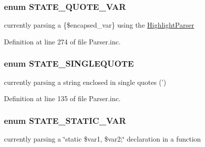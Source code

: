 \hypertarget{_parser_8inc_a17d02e9f1470078199e148eb54941eac}{
\subsubsection[{\-S\-T\-A\-T\-E\-\_\-\-Q\-U\-O\-T\-E\-\_\-\-V\-A\-R}]{\setlength{\rightskip}{0pt plus 5cm}enum {\bf \-S\-T\-A\-T\-E\-\_\-\-Q\-U\-O\-T\-E\-\_\-\-V\-A\-R}}}\label{_parser_8inc_a17d02e9f1470078199e148eb54941eac}
currently parsing a \{\$encapsed\-\_\-var\} using the \hyperlink{}{\-Highlight\-Parser} 

\-Definition at line 274 of file \-Parser.\-inc.

\hypertarget{_parser_8inc_afbf0444de83d08ee182eb035ea5c6073}{
\subsubsection[{\-S\-T\-A\-T\-E\-\_\-\-S\-I\-N\-G\-L\-E\-Q\-U\-O\-T\-E}]{\setlength{\rightskip}{0pt plus 5cm}enum {\bf \-S\-T\-A\-T\-E\-\_\-\-S\-I\-N\-G\-L\-E\-Q\-U\-O\-T\-E}}}\label{_parser_8inc_afbf0444de83d08ee182eb035ea5c6073}
currently parsing a string enclosed in single quotes (') 

\-Definition at line 135 of file \-Parser.\-inc.

\hypertarget{_parser_8inc_a567e1294f489a07f5c682a4231fa7bcf}{
\subsubsection[{\-S\-T\-A\-T\-E\-\_\-\-S\-T\-A\-T\-I\-C\-\_\-\-V\-A\-R}]{\setlength{\rightskip}{0pt plus 5cm}enum {\bf \-S\-T\-A\-T\-E\-\_\-\-S\-T\-A\-T\-I\-C\-\_\-\-V\-A\-R}}}\label{_parser_8inc_a567e1294f489a07f5c682a4231fa7bcf}
currently parsing a \char`\"{}static \$var1, \$var2;\char`\"{} declaration in a function 

